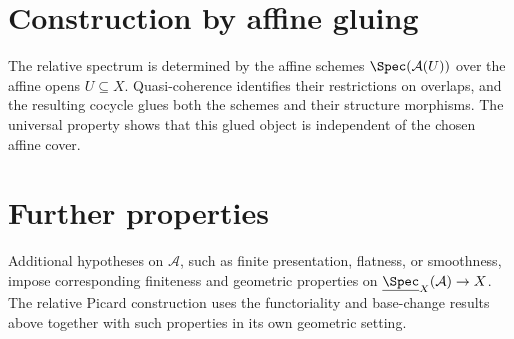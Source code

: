 \section{Construction by affine gluing}
\label{sec:relspec_lean_encoding}

The relative spectrum is determined by the affine schemes
\(\Spec(\mathcal{A}(U))\) over the affine opens \(U \subseteq X\). Quasi-coherence
identifies their restrictions on overlaps, and the resulting cocycle glues both the
schemes and their structure morphisms. The universal property shows that this glued
object is independent of the chosen affine cover.

\section{Further properties}
\label{sec:relspec_out_of_scope}

Additional hypotheses on \(\mathcal{A}\), such as finite presentation, flatness, or
smoothness, impose corresponding finiteness and geometric properties on
\(\underline{\Spec}_X(\mathcal{A}) \to X\). The relative Picard construction uses the
functoriality and base-change results above together with such properties in its own
geometric setting.

